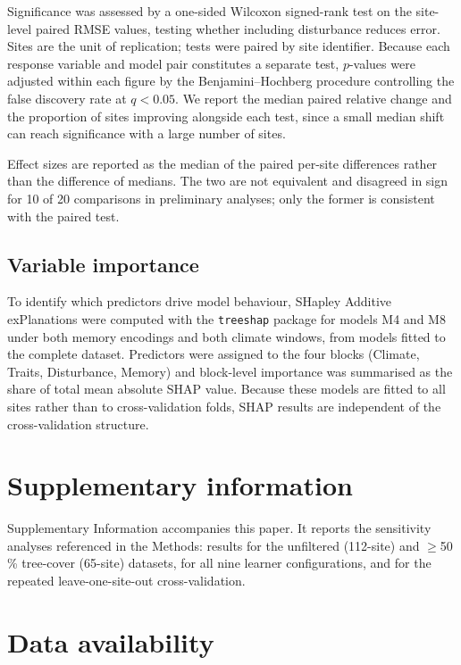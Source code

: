 \documentclass[pdflatex,sn-nature]{sn-jnl}%
\theoremstyle{thmstyleone}%
\theoremstyle{thmstyletwo}%
\theoremstyle{thmstylethree}%
\begin{document}
Significance was assessed by a one-sided Wilcoxon signed-rank test on the site-level paired RMSE values, testing whether including disturbance reduces error. Sites are the unit of replication; tests were paired by site identifier. Because each response variable and model pair constitutes a separate test, $p$-values were adjusted within each figure by the Benjamini--Hochberg procedure controlling the false discovery rate at $q < 0.05$. We report the median paired relative change and the proportion of sites improving alongside each test, since a small median shift can reach significance with a large number of sites.

Effect sizes are reported as the median of the paired per-site differences rather than the difference of medians. The two are not equivalent and disagreed in sign for 10 of 20 comparisons in preliminary analyses; only the former is consistent with the paired test.

\subsection*{Variable importance}

To identify which predictors drive model behaviour, SHapley Additive exPlanations \cite{lundberg2017unified} were computed with the \texttt{treeshap} package \cite{kozmarski2021treeshap} for models M4 and M8 under both memory encodings and both climate windows, from models fitted to the complete dataset. Predictors were assigned to the four blocks (Climate, Traits, Disturbance, Memory) and block-level importance was summarised as the share of total mean absolute SHAP value. Because these models are fitted to all sites rather than to cross-validation folds, SHAP results are independent of the cross-validation structure.


\backmatter

\section*{Supplementary information}

Supplementary Information accompanies this paper. It reports the sensitivity analyses referenced in the Methods: results for the unfiltered (112-site) and $\geq$50\,\% tree-cover (65-site) datasets, for all nine learner configurations, and for the repeated leave-one-site-out cross-validation.

\section*{Data availability}
\end{document}
